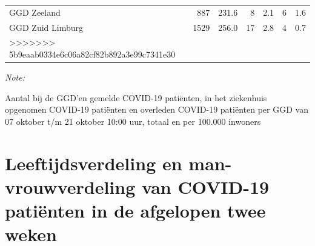 \documentclass[
  english,
  man,floatsintext]{apa6}
\begin{document}
\begin{table}[H]
\begin{threeparttable}
\begin{tabular}{lrrrrrr}
GGD Zeeland & 887 & 231.6 & 8 & 2.1 & 6 & 1.6\\
GGD Zuid Limburg & 1529 & 256.0 & 17 & 2.8 & 4 & 0.7\\
>>>>>>> 5b9eaab0334e6c06a82cf82b892a3e99c7341e30
\bottomrule
\end{tabular}
\begin{tablenotes}
\item \textit{Note: } 
\item Aantal bij de GGD’en gemelde COVID-19 patiënten, in het ziekenhuis opgenomen COVID-19 patiënten en overleden COVID-19 patiënten per GGD van 07 oktober t/m 21 oktober 10:00 uur, totaal en per 100.000 inwoners
\end{tablenotes}
\end{threeparttable}
\endgroup{}
\end{table}

\newpage

\hypertarget{leeftijdsverdeling-en-man-vrouwverdeling-van-covid-19-patiuxebnten-in-de-afgelopen-twee-weken}{%
\section{Leeftijdsverdeling en man-vrouwverdeling van COVID-19 patiënten in de afgelopen twee weken}\label{leeftijdsverdeling-en-man-vrouwverdeling-van-covid-19-patiuxebnten-in-de-afgelopen-twee-weken}}
\end{document}
